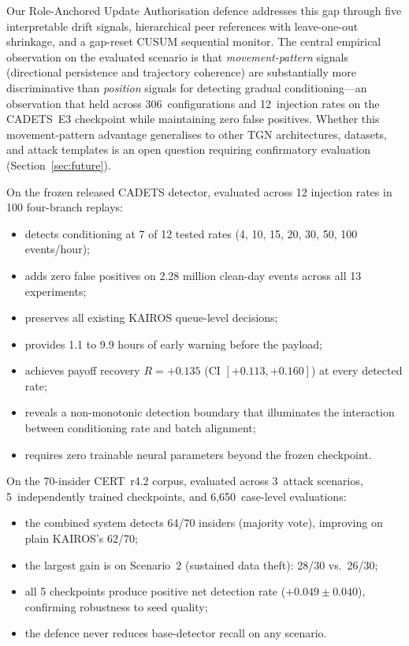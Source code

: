 \documentclass[10pt,twocolumn]{article}
\begin{document}
Our Role-Anchored Update Authorisation defence addresses this gap through
five interpretable drift signals, hierarchical peer references with
leave-one-out shrinkage, and a gap-reset CUSUM sequential monitor.  The
central empirical observation on the evaluated scenario is that
\emph{movement-pattern} signals (directional persistence and trajectory
coherence) are substantially more discriminative than \emph{position}
signals for detecting gradual conditioning---an observation that held
across 306~configurations and 12~injection rates on the CADETS~E3
checkpoint while maintaining zero false positives.  Whether this
movement-pattern advantage generalises to other TGN architectures,
datasets, and attack templates is an open question requiring
confirmatory evaluation (Section~\ref{sec:future}).

On the frozen released CADETS detector, evaluated across 12 injection
rates in 100 four-branch replays:
\begin{itemize}
  \item detects conditioning at 7 of 12 tested rates
    (4, 10, 15, 20, 30, 50, 100 events/hour);
  \item adds zero false positives on 2.28 million clean-day events
    across all 13 experiments;
  \item preserves all existing KAIROS queue-level decisions;
  \item provides 1.1 to 9.9 hours of early warning before the payload;
  \item achieves payoff recovery $R=+0.135$
    (CI $[+0.113,+0.160]$) at every detected rate;
  \item reveals a non-monotonic detection boundary that illuminates the
    interaction between conditioning rate and batch alignment;
  \item requires zero trainable neural parameters beyond the frozen
    checkpoint.
\end{itemize}

On the 70-insider CERT~r4.2 corpus, evaluated across 3~attack scenarios,
5~independently trained checkpoints, and 6,650~case-level evaluations:
\begin{itemize}
  \item the combined system detects 64/70 insiders (majority vote),
    improving on plain KAIROS's 62/70;
  \item the largest gain is on Scenario~2 (sustained data theft):
    28/30 vs.\ 26/30;
  \item all 5 checkpoints produce positive net detection rate
    ($+0.049 \pm 0.040$), confirming robustness to seed quality;
  \item the defence never reduces base-detector recall on any scenario.
\end{itemize}
\end{document}
